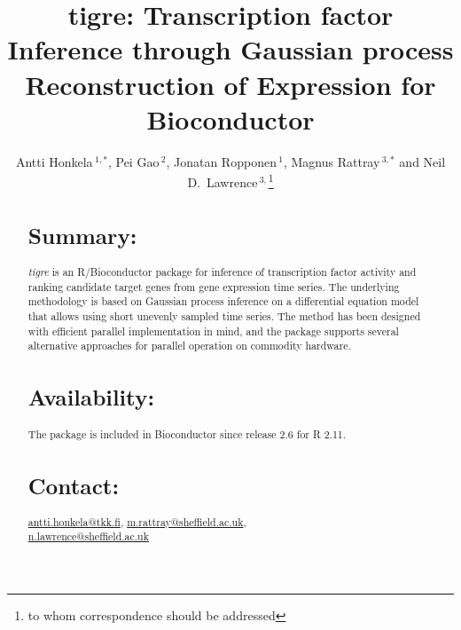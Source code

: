 \documentclass{bioinfo}
\newcommand{\tigre}{\emph{tigre}}
\begin{document}

\title[tigre]{tigre: Transcription factor Inference through Gaussian process Reconstruction of Expression for Bioconductor}
\author[Honkela \textit{et~al.}]{Antti Honkela\,$^{1,*}$, Pei Gao\,$^{2}$, Jonatan Ropponen\,$^{1}$, Magnus Rattray\,$^{3,*}$ and Neil D.\ Lawrence\,$^{3,}$\footnote{to whom correspondence should be addressed}}
\address{$^{1}$Department of Information and Computer Science, Aalto
  University School of Science and Technology, Helsinki, Finland\\
  $^{2}$Department of of Public Health and Primary Care, University of
  Cambridge, Cambridge, UK\\
  $^{3}$ Sheffield Institute for Translational Medicine and
  Department of Computer Science, University of Sheffield, Sheffield, UK}



\maketitle

\begin{abstract}

\section{Summary:}
\tigre{} is an R/Bioconductor package for inference of transcription
factor activity and ranking candidate target genes from gene
expression time series.  The underlying methodology is based on
Gaussian process inference on a differential equation model that
allows using short unevenly sampled time series.  The method has been
designed with efficient parallel implementation in mind, and the
package supports several alternative approaches for parallel operation
on commodity hardware.

\section{Availability:}
The package is included in Bioconductor since release 2.6 for R 2.11.

\section{Contact:} \href{antti.honkela@tkk.fi}{antti.honkela@tkk.fi},
\href{m.rattray@sheffield.ac.uk}{m.rattray@sheffield.ac.uk},\\
\href{n.lawrence@sheffield.ac.uk}{n.lawrence@sheffield.ac.uk}
\end{abstract}
\end{document}
